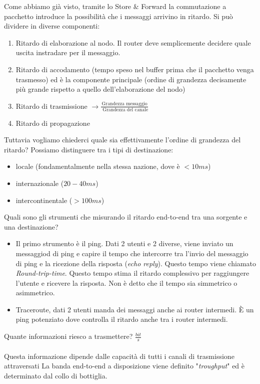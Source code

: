 \documentclass[a4paper]{article}
\begin{document}
Come abbiamo già visto, tramite lo Store $\&$ Forward la commutazione a pacchetto introduce la possibilità che i messaggi arrivino in ritardo. Si può dividere in diverse componenti: 
\begin{enumerate}
    \item Ritardo di elaborazione al nodo. Il router deve semplicemente decidere quale uscita instradare per il messaggio.
    \item Ritardo di accodamento (tempo speso nel buffer prima che il pacchetto venga trasmesso) ed è la componente principale (ordine di grandezza decisamente più grande rispetto a quello dell'elaborazione del nodo)
    \item Ritardo di trasmissione $\rightarrow \frac{\text{Grandezza messaggio}}{\text{ Grandezza del canale}}$
    \item Ritardo di propagazione
\end{enumerate}
Tuttavia vogliamo chiederci quale sia effettivamente l'ordine di grandezza del ritardo? 
Possiamo distinguere tra i tipi di destinazione:
\begin{itemize}
    \item locale (fondamentalmente nella stessa nazione, dove è $< 10 ms$) 
    \item internazionale ($20-40 ms$)
    \item intercontinentale ($> 100 ms$)
\end{itemize}
Quali sono gli strumenti che misurando il ritardo end-to-end tra una sorgente e una destinazione? 
\begin{itemize}
    \item Il primo strumento è il ping. Dati 2 utenti e 2 diverse, viene inviato un messaggiod di ping e capire il tempo che intercorre tra l'invio del messaggio di ping e la ricezione della risposta (\textit{echo reply}). Questo tempo viene chiamato \textit{Round-trip-time}. Questo tempo stima il ritardo complessivo per raggiungere l'utente e ricevere la risposta. Non è detto che il tempo sia simmetrico o asimmetrico. 
    \item Traceroute, dati 2 utenti manda dei messaggi anche ai router intermedi. È un ping potenziato dove controlla il ritardo anche tra i router intermedi. 
\end{itemize}
Quante informazioni riesco a trasmettere? $\frac{bit}{s}$
\\\\Questa informazione dipende dalle capacità di tutti i canali di trasmissione attraversati
La banda end-to-end a disposizione viene definito "\textit{troughput}" ed è determinato dal collo di bottiglia. 
\end{document}
